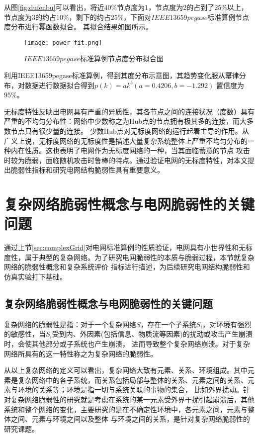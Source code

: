 从图\ref{fig:dufenbu}可以看出，将近$40\%$节点度为1，节点度为2的占到了$25\%$以上，节点度为3的约占$10\%$，剩下的约占$25\%$，下面对$IEEE13659pegase$标准算例节点度分布进行幂函数拟合。
其拟合结果如图所示。
\begin{figure}[H] %
  \centering
  \texttt{[image: power\_fit.png]}
  \caption{$IEEE13659pegase$标准算例节点度分布拟合图}
  \label{fig:fower_fit}
\end{figure}

利用IEEE13659pegase标准算例，得到其度分布示意图，其趋势变化服从幂律分布，对数据进行数据拟合得到$p(k)=a k^{b}(a=0.4206, b=-1.292)$ 置信度为$95\%$。

无标度特性反映出电网具有严重的异质性，其各节点之间的连接状况（度数）具有严重的不均匀分布性：网络中少数称之为Hub点的节点拥有极其多的连接，而大多数节点只有很少量的连接。
少数Hub点对无标度网络的运行起着主导的作用。从广义上说，无标度网络的无标度性是描述大量复杂系统整体上严重不均匀分布的一种内在性质。这也表明了电网作为无标度网络的一种，当其面临蓄意的节点
攻击时较为脆弱，面临随机攻击时鲁棒的特点。通过验证电网的无标度特性，对本文提出脆弱性指标和研究电网结构脆弱性具有重要意义。

\section{复杂网络脆弱性概念与电网脆弱性的关键问题}
\label{sec:load}
通过上节\ref{sec:complexGrid}对电网标准算例的性质验证，电网具有小世界性和无标度性，属于典型的复杂网络。为了研究电网脆弱性的本质与脆弱过程，本节就复杂网络的脆弱性概念和复杂系统评价
指标进行描述，为后续研究电网结构脆弱性和仿真实验打下基础。

\subsection{复杂网络脆弱性概念与电网脆弱性的关键问题}
\label{sec:loadEffect}
复杂网络的脆弱性是指：对于一个复杂网络$S$，存在一个子系统$S_i$，对环境有强烈的敏感性，当$S_i$受到内、外因素(包括信息、物质流等因素)的扰动或攻击产生崩溃时，会使其他部分或子系统也产生崩溃，
进而导致整个复杂网络崩溃。对于复杂网络所具有的这一特性称之为复杂网络的脆弱性。

从以上复杂网络的定义可以看出，复杂网络大致有元素、关系、环境组成。其中元素是复杂网络中的各子系统，而关系包括局部与整体的关系、元素之间的关系、元素与环境的关系等；环境是指一切与系统关联的事物的集合，
比如外界扰动。针对复杂网络脆弱性的研究就是考虑在系统的某一元素受外界干扰引起崩溃后，其他系统和整个网络的变化，主要研究的是在不确定性环境中，各元素之间，元素与整体之间、元素与环境之间以及整体
与环境之间的关系，是针对复杂网络脆弱性的研究课题\cite{refs31}。

